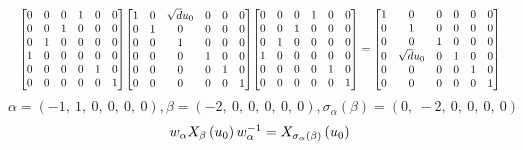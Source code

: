 \documentclass[11pt]{article}
\theoremstyle{definition}
\begin{document}
\[
\scaletoalign{\textwidth}{{\left[\begin{matrix}0 & 0 & 0 & 1 & 0 & 0\\0 & 0 & 1 & 0 & 0 & 0\\0 & 1 & 0 & 0 & 0 & 0\\1 & 0 & 0 & 0 & 0 & 0\\0 & 0 & 0 & 0 & 1 & 0\\0 & 0 & 0 & 0 & 0 & 1\end{matrix}\right]} {\left[\begin{matrix}1 & 0 & \sqrt{d} u_{0} & 0 & 0 & 0\\0 & 1 & 0 & 0 & 0 & 0\\0 & 0 & 1 & 0 & 0 & 0\\0 & 0 & 0 & 1 & 0 & 0\\0 & 0 & 0 & 0 & 1 & 0\\0 & 0 & 0 & 0 & 0 & 1\end{matrix}\right]} {\left[\begin{matrix}0 & 0 & 0 & 1 & 0 & 0\\0 & 0 & 1 & 0 & 0 & 0\\0 & 1 & 0 & 0 & 0 & 0\\1 & 0 & 0 & 0 & 0 & 0\\0 & 0 & 0 & 0 & 1 & 0\\0 & 0 & 0 & 0 & 0 & 1\end{matrix}\right]} = {\left[\begin{matrix}1 & 0 & 0 & 0 & 0 & 0\\0 & 1 & 0 & 0 & 0 & 0\\0 & 0 & 1 & 0 & 0 & 0\\0 & \sqrt{d} u_{0} & 0 & 1 & 0 & 0\\0 & 0 & 0 & 0 & 1 & 0\\0 & 0 & 0 & 0 & 0 & 1\end{matrix}\right]}}
\]
\[
\alpha = \left( -1, \  1, \  0, \  0, \  0, \  0\right), \beta = \left( -2, \  0, \  0, \  0, \  0, \  0\right), \sigma_{\alpha}(\beta) = \left( 0, \  -2, \  0, \  0, \  0, \  0\right)
\]
\[
\scaletoalign{\textwidth}{w_{\alpha} X_{\beta}\left(u_{0}\right) w_{\alpha}^{-1} = X_{\sigma_{\alpha}\left(\beta\right)}\left(u_{0}\right)}
\]
\end{document}
